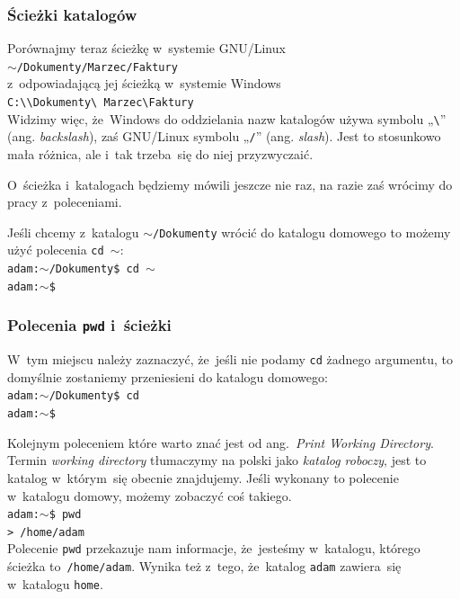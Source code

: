 \documentclass[10pt,t]{beamer}
\begin{document}
\begin{frame}
  \frametitle{Ścieżki katalogów}


  Porównajmy teraz ścieżkę w~systemie GNU/Linux \\
  \texttt{$\sim$/Dokumenty/Marzec/Faktury} \\
  z~odpowiadającą jej ścieżką w~systemie Windows \\
  \texttt{C:\textbackslash\textbackslash Dokumenty\textbackslash
    Marzec\textbackslash Faktury} \\
  Widzimy więc, że~Windows do oddzielania nazw katalogów używa symbolu
  „\texttt{\textbackslash}” (ang. \textit{backslash}), zaś GNU/Linux
  symbolu „\texttt{/}” (ang. \textit{slash}). Jest to stosunkowo mała
  różnica, ale i~tak trzeba~się do niej przyzwyczaić.

  O~ścieżka i~katalogach będziemy mówili jeszcze nie raz, na razie
  zaś wrócimy do pracy z~poleceniami.

  Jeśli chcemy z~katalogu \texttt{$\sim$/Dokumenty} wrócić do katalogu
  domowego to możemy użyć polecenia \texttt{cd $\sim$}: \\
  \texttt{adam:$\sim$/Dokumenty\$ cd $\sim$} \\
  \texttt{adam:$\sim$\$}

\end{frame}





\begin{frame}
  \frametitle{Polecenia \texttt{pwd} i~ścieżki}


  W~tym miejscu należy zaznaczyć, że~jeśli nie podamy \texttt{cd}
  żadnego argumentu, to domyślnie zostaniemy przeniesieni do katalogu
  domowego: \\
  \texttt{adam:$\sim$/Dokumenty\$ cd} \\
  \texttt{adam:$\sim$\$}

  Kolejnym poleceniem które warto znać jest
  od ang.~\textit{Print Working Directory}. Termin
  \textit{working directory} tłumaczymy na polski jako \textit{katalog
    roboczy}, jest to katalog w~którym~się obecnie znajdujemy. Jeśli
  wykonany to polecenie w~katalogu domowy, możemy zobaczyć coś takiego. \\
  \texttt{adam:$\sim$\$ pwd} \\
  \texttt{> /home/adam} \\
  Polecenie \texttt{pwd} przekazuje nam informacje, że~jesteśmy
  w~katalogu, którego ścieżka to~\texttt{/home/adam}. Wynika też z~tego,
  że~katalog \texttt{adam} zawiera~się w~katalogu \texttt{home}.

\end{frame}
\end{document}
